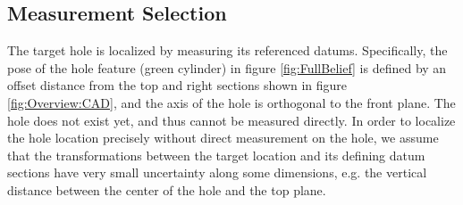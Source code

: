 \documentclass[letterpaper, 10 pt, conference]{ieeeconf}
\begin{document}
\subsection{Measurement Selection}

The target hole is localized by measuring its referenced datums. 
Specifically, the pose of the hole feature (green cylinder) in figure \ref{fig:FullBelief} is defined by an offset distance from the top and right sections shown in figure \ref{fig:Overview:CAD}, and the axis of the hole is orthogonal to the front plane. 
The hole does not exist yet, and thus cannot be measured directly.
In order to localize the hole location precisely without direct measurement on the hole, we assume that the transformations between the target location and its defining datum sections have very small uncertainty along some dimensions, e.g. the vertical distance between the center of the hole and the top plane.
\end{document}
